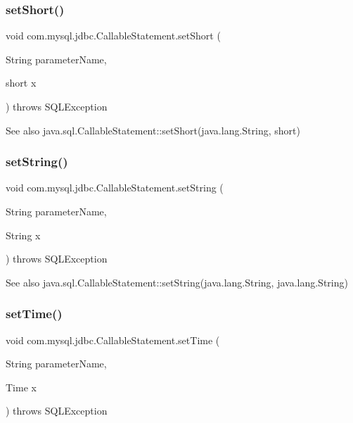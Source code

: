 \subsubsection{\texorpdfstring{set\+Short()}{setShort()}}
{\footnotesize\ttfamily void com.\+mysql.\+jdbc.\+Callable\+Statement.\+set\+Short (\begin{DoxyParamCaption}\item[{String}]{parameter\+Name,  }\item[{short}]{x }\end{DoxyParamCaption}) throws S\+Q\+L\+Exception}

\begin{DoxySeeAlso}{See also}
java.\+sql.\+Callable\+Statement\+::set\+Short(java.\+lang.\+String, short) 
\end{DoxySeeAlso}
\mbox{\label{classcom_1_1mysql_1_1jdbc_1_1_callable_statement_ad2fcf3142fbe101af83b0ee9b9d45f9c}} 
\subsubsection{\texorpdfstring{set\+String()}{setString()}}
{\footnotesize\ttfamily void com.\+mysql.\+jdbc.\+Callable\+Statement.\+set\+String (\begin{DoxyParamCaption}\item[{String}]{parameter\+Name,  }\item[{String}]{x }\end{DoxyParamCaption}) throws S\+Q\+L\+Exception}

\begin{DoxySeeAlso}{See also}
java.\+sql.\+Callable\+Statement\+::set\+String(java.\+lang.\+String, java.\+lang.\+String) 
\end{DoxySeeAlso}
\mbox{\label{classcom_1_1mysql_1_1jdbc_1_1_callable_statement_a3a17ab41bb2d2edd46042dc05aadda4d}} 
\subsubsection{\texorpdfstring{set\+Time()}{setTime()}\hspace{0.1cm}{\footnotesize\ttfamily [1/2]}}
{\footnotesize\ttfamily void com.\+mysql.\+jdbc.\+Callable\+Statement.\+set\+Time (\begin{DoxyParamCaption}\item[{String}]{parameter\+Name,  }\item[{Time}]{x }\end{DoxyParamCaption}) throws S\+Q\+L\+Exception}

